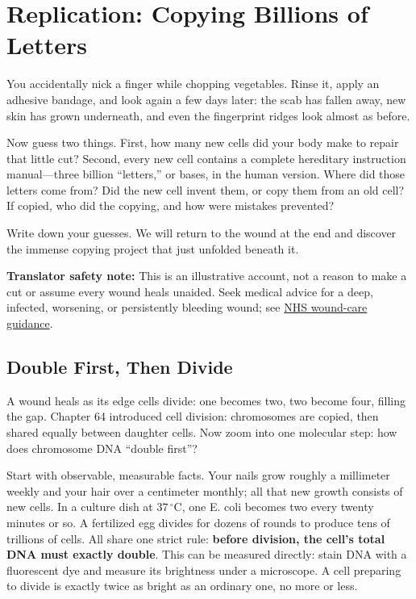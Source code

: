 \chapter{Replication: Copying Billions of Letters}

\begin{kaichang}
You accidentally nick a finger while chopping vegetables. Rinse it, apply an adhesive bandage, and look again a few days later: the scab has fallen away, new skin has grown underneath, and even the fingerprint ridges look almost as before.

Now guess two things. First, how many new cells did your body make to repair that little cut? Second, every new cell contains a complete hereditary instruction manual---three billion ``letters,'' or bases, in the human version. Where did those letters come from? Did the new cell invent them, or copy them from an old cell? If copied, who did the copying, and how were mistakes prevented?

Write down your guesses. We will return to the wound at the end and discover the immense copying project that just unfolded beneath it.
\end{kaichang}

\textbf{Translator safety note:} This is an illustrative account, not a reason to make a cut or assume every wound heals unaided. Seek medical advice for a deep, infected, worsening, or persistently bleeding wound; see \href{https://www.nhs.uk/conditions/cuts-and-grazes/}{NHS wound-care guidance}.

\section{Double First, Then Divide}

A wound heals as its edge cells divide: one becomes two, two become four, filling the gap. Chapter 64 introduced cell division: chromosomes are copied, then shared equally between daughter cells. Now zoom into one molecular step: how does chromosome DNA ``double first''?

Start with observable, measurable facts. Your nails grow roughly a millimeter weekly and your hair over a centimeter monthly; all that new growth consists of new cells. In a culture dish at $37\,^{\circ}\mathrm{C}$, one E. coli becomes two every twenty minutes or so. A fertilized egg divides for dozens of rounds to produce tens of trillions of cells. All share one strict rule: \textbf{before division, the cell's total DNA must exactly double}. This can be measured directly: stain DNA with a fluorescent dye and measure its brightness under a microscope. A cell preparing to divide is exactly twice as bright as an ordinary one, no more or less.


